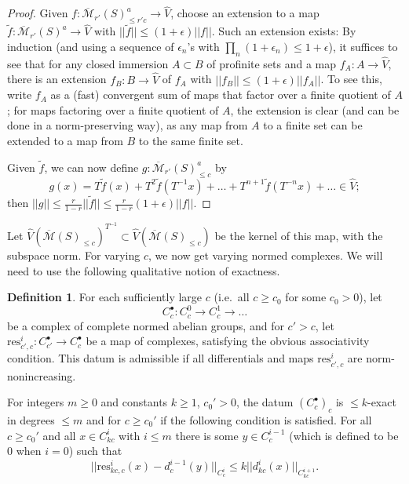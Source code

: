 \documentclass[11pt]{amsbook}
\renewcommand*{\tilde}{\widetilde}
\numberwithin{equation}{section}
\numberwithin{theorem}{section}
\theoremstyle{definition}
\newtheorem{definition}[theorem]{Definition}
\begin{document}
\begin{proof} Given $f: \overline{\mathcal M}_{r'}(S)_{\leq r'c}^a\to \widehat{V}$, choose an extension to a map $\tilde{f}: \overline{\mathcal M}_{r'}(S)^a\to \widehat{V}$ with $||\tilde{f}||\leq (1+\epsilon)||f||$. Such an extension exists: By induction (and using a sequence of $\epsilon_n$'s with $\prod_n (1+\epsilon_n)\leq 1+\epsilon$), it suffices to see that for any closed immersion $A\subset B$ of profinite sets and a map $f_A: A\to \widehat{V}$, there is an extension $f_B: B\to \widehat{V}$ of $f_A$ with $||f_B||\leq (1+\epsilon)||f_A||$. To see this, write $f_A$ as a (fast) convergent sum of maps that factor over a finite quotient of $A$; for maps factoring over a finite quotient of $A$, the extension is clear (and can be done in a norm-preserving way), as any map from $A$ to a finite set can be extended to a map from $B$ to the same finite set.

Given $\tilde{f}$, we can now define $g: \overline{\mathcal M}_{r'}(S)_{\leq c}^a$ by
\[
g(x) = T\tilde{f}(x)+T^2\tilde{f}(T^{-1}x)+\ldots+T^{n+1}\tilde{f}(T^{-n}x)+\ldots\in \widehat{V};
\]
then $||g||\leq \frac r{1-r}||\tilde{f}||\leq \frac r{1-r}(1+\epsilon)||f||$.
\end{proof}

Let $\widehat{V}(\overline{\mathcal M}(S)_{\leq c})^{T^{-1}}\subset \widehat{V}(\overline{\mathcal M}(S)_{\leq c})$ be the kernel of this map, with the subspace norm. For varying $c$, we now get varying normed complexes. We will need to use the following qualitative notion of exactness.

\begin{definition} For each sufficiently large $c$ (i.e.~all $c\geq c_0$ for some $c_0>0$), let
\[
C_c^\bullet: C_c^0\to C_c^1\to\ldots
\]
be a complex of complete normed abelian groups, and for $c'>c$, let $\mathrm{res}_{c',c}^i: C_{c'}^\bullet\to C_c^\bullet$ be a map of complexes, satisfying the obvious associativity condition. This datum is admissible if all differentials and maps $\mathrm{res}_{c',c}^i$ are norm-nonincreasing.

For integers $m\geq 0$ and constants $k \ge 1$, $c_0'>0$, the datum $(C_c^\bullet)_c$ is $\leq k$-exact in degrees $\leq m$ and for $c\geq c_0'$ if the following condition is satisfied. For all $c\geq c_0'$ and all $x\in C_{kc}^i$ with $i\leq m$ there is some $y\in C_c^{i-1}$ (which is defined to be $0$ when $i=0$) such that
\[
||\mathrm{res}_{kc,c}^i(x)-d_c^{i-1}(y)||_{C_c^i}\leq k||d_{kc}^i(x)||_{C_{kc}^{i+1}}.
\]
\end{definition}
\end{document}
